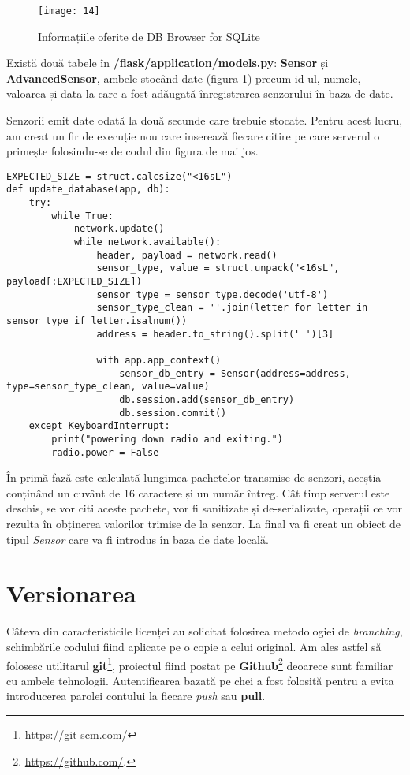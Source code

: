 \begin{figure}[h]
	\centering
	\texttt{[image: 14]}
	\caption{Informațiile oferite de DB Browser for SQLite}
	\label{fig:14}
\end{figure}

Există două tabele în \textbf{/flask/application/models.py}: \textbf{Sensor} și \textbf{AdvancedSensor}, ambele stocând date (figura \ref{fig:14}) precum id-ul, numele, valoarea și data la care a fost adăugată înregistrarea senzorului în baza de date.

\break

Senzorii emit date odată la două secunde care trebuie stocate. Pentru acest lucru, am creat un fir de execuție nou care inserează fiecare citire pe care serverul o primește folosindu-se de codul din figura de mai jos.

\begin{lstlisting}[style=python, label=code:db]
EXPECTED_SIZE = struct.calcsize("<16sL")
def update_database(app, db):
	try:
		while True:
			network.update()
			while network.available():
				header, payload = network.read()
				sensor_type, value = struct.unpack("<16sL", payload[:EXPECTED_SIZE])
				sensor_type = sensor_type.decode('utf-8')
				sensor_type_clean = ''.join(letter for letter in sensor_type if letter.isalnum())
				address = header.to_string().split(' ')[3]
				
				with app.app_context()
					sensor_db_entry = Sensor(address=address, type=sensor_type_clean, value=value)
					db.session.add(sensor_db_entry)
					db.session.commit()
	except KeyboardInterrupt:
		print("powering down radio and exiting.")
		radio.power = False
\end{lstlisting}

În primă fază este calculată lungimea pachetelor transmise de senzori, aceștia conținând un cuvânt de 16 caractere și un număr întreg. Cât timp serverul este deschis, se vor citi aceste pachete, vor fi sanitizate și de-serializate, operații ce vor rezulta în obținerea valorilor trimise de la senzor.
La final va fi creat un obiect de tipul \emph{Sensor} care va fi introdus în baza de date locală.


\section{Versionarea}

Câteva din caracteristicile licenței au solicitat folosirea metodologiei de \emph{branching}, schimbările codului fiind aplicate pe o copie a celui original. Am ales astfel să folosesc utilitarul \textbf{git}\footnote{\url{https://git-scm.com/}}, proiectul fiind postat pe \textbf{Github}\footnote{\url{https://github.com/}.} deoarece sunt familiar cu ambele tehnologii. Autentificarea bazată pe chei a fost folosită pentru a evita introducerea parolei contului la fiecare \emph{push} sau \textbf{pull}.